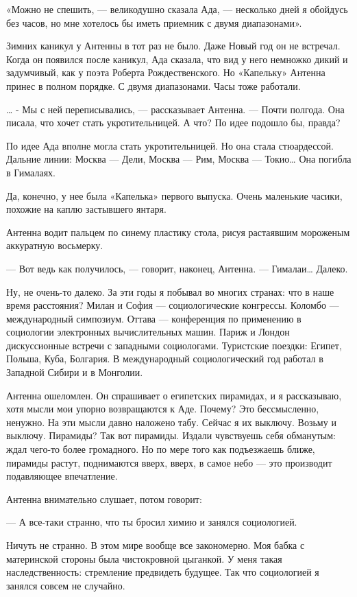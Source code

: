 «Можно не спешить, — великодушно сказала Ада, — несколько дней я  обойдусь
без часов, но мне хотелось бы иметь приемник с двумя диапазонами».

Зимних каникул у Антенны в тот раз не было. Даже Новый год он не встречал.
Когда он появился  после каникул,  Ада сказала,  что вид  у него  немножко
дикий и задумчивый,  как у  поэта Роберта  Рождественского. Но  «Капельку»
Антенна принес в полном порядке. С двумя диапазонами. Часы тоже работали.

… - Мы с ней переписывались, — рассказывает Антенна. — Почти полгода.  Она
писала, что  хочет  стать укротительницей.  А  что? По  идее  подошло  бы,
правда?

По идее Ада вполне могла стать укротительницей. Но она стала  стюардессой.
Дальние линии: Москва — Дели, Москва — Рим, Москва — Токио… Она погибла  в
Гималаях.

Да, конечно,  у  нее  была «Капелька»  первого  выпуска.  Очень  маленькие
часики, похожие на каплю застывшего янтаря.

Антенна водит пальцем по синему пластику стола, рисуя растаявшим мороженым
аккуратную восьмерку.

— Вот ведь как получилось, — говорит, наконец, Антенна. — Гималаи… Далеко.

Ну, не очень-то далеко.  За эти годы  я побывал во  многих странах: что  в
наше время расстояния? Милан и София — социологические конгрессы.  Коломбо
— международный симпозиум. Оттава — конференция по применению в социологии
электронных вычислительных машин. Париж  и Лондон дискуссионные встречи  с
западными социологами. Туристские поездки: Египет, Польша, Куба, Болгария.
В  международный  социологический  год  работал  в  Западной  Сибири  и  в
Монголии.

Антенна ошеломлен. Он спрашивает о египетских пирамидах, и я  рассказываю,
хотя мысли  мои  упорно  возвращаются к  Аде.  Почему?  Это  бессмысленно,
ненужно. На эти мысли давно наложено  табу. Сейчас я их выключу. Возьму  и
выключу. Пирамиды?  Так вот  пирамиды. Издали  чувствуешь себя  обманутым:
ждал чего-то  более громадного.  Но по  мере того  как подъезжаешь  ближе,
пирамиды растут, поднимаются вверх, вверх,  в самое небо — это  производит
подавляющее впечатление.

Антенна внимательно слушает, потом говорит:

— А все-таки странно, что ты бросил химию и занялся социологией.

Ничуть не  странно.  В этом  мире  вообще  все закономерно.  Моя  бабка  с
материнской   стороны   была   чистокровной   цыганкой.   У   меня   такая
наследственность: стремление  предвидеть будущее.  Так что  социологией  я
занялся совсем не случайно.

